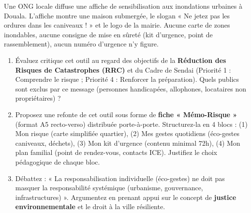 \documentclass[11pt]{article}
\begin{document}
\begin{exercice}
    Une ONG locale diffuse une affiche de sensibilisation aux inondations urbaines à Douala. L'affiche montre une maison submergée, le slogan « Ne jetez pas les ordures dans les caniveaux ! » et le logo de la mairie. Aucune carte de zones inondables, aucune consigne de mise en sûreté (kit d'urgence, point de rassemblement), aucun numéro d'urgence n'y figure.
    \begin{enumerate}
        \item Évaluez critique cet outil au regard des objectifs de la \textbf{Réduction des Risques de Catastrophes (RRC)} et du Cadre de Sendai (Priorité 1 : Comprendre le risque ; Priorité 4 : Renforcer la préparation). Quels publics sont exclus par ce message (personnes handicapées, allophones, locataires non propriétaires) ?
        \item Proposez une refonte de cet outil sous forme de \textbf{fiche « Mémo-Risque »} (format A5 recto-verso) distribuée porte-à-porte. Structurez-la en 4 blocs : (1) Mon risque (carte simplifiée quartier), (2) Mes gestes quotidiens (éco-gestes caniveaux, déchets), (3) Mon kit d'urgence (contenu minimal 72h), (4) Mon plan familial (point de rendez-vous, contacts ICE). Justifiez le choix pédagogique de chaque bloc.
        \item Débattez : « La responsabilisation individuelle (éco-gestes) ne doit pas masquer la responsabilité systémique (urbanisme, gouvernance, infrastructures) ». Argumentez en prenant appui sur le concept de \textbf{justice environnementale} et le droit à la ville résiliente.
    \end{enumerate}
\end{exercice}
\end{document}
